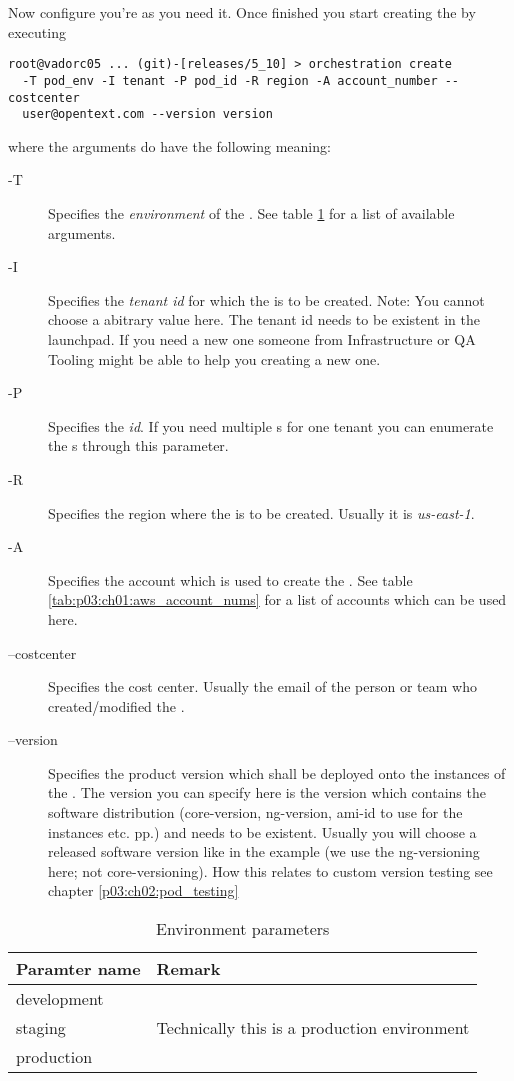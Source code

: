 	Now configure you're \pod{} as you need it. Once finished you start creating the \pod{} by executing
	\begin{verbatim}
root@vadorc05 ... (git)-[releases/5_10] > orchestration create 
  -T pod_env -I tenant -P pod_id -R region -A account_number --costcenter 
  user@opentext.com --version version
	\end{verbatim}
	where the arguments do have the following meaning:
	\begin{description}
		\item[-T] Specifies the \emph{environment} of the \pod{}. See table \ref{tab:p03:ch01:pod_envs} for a list of available arguments.
		\item[-I] Specifies the \emph{tenant id} for which the \pod{} is to be created. Note: You cannot choose a abitrary value here. The tenant id needs to be existent in the launchpad. If you need a new one someone from Infrastructure or QA Tooling might be able to help you creating a new one.
		\item[-P] Specifies the \emph{\pod{} id}. If you need multiple \pod{}s for one tenant you can enumerate the \pod{}s through this parameter.
		\item[-R] Specifies the \aws{} region where the \pod{} is to be created. Usually it is \emph{us-east-1}.
		\item[-A] Specifies the \aws{} account which is used to create the \pod{}. See table \ref{tab:p03:ch01:aws_account_nums} for a list of accounts which can be used here.
		\item[--costcenter] Specifies the cost center. Usually the email of the person or team who created/modified the \pod{}.
		\item[--version] Specifies the product version which shall be deployed onto the instances of the \pod{}. The version you can specify here is the \axceleratepod{} version which contains the software distribution (core-version, ng-version, ami-id to use for the instances etc. pp.) and needs to be existent. Usually you will choose a released software version like in the example (we use the ng-versioning here; not core-versioning). How this relates to custom version testing see chapter \ref{p03:ch02:pod_testing}
	\end{description}
	\begin{table}[h]
         \center
         \caption{\aws{} Environment parameters}
         \begin{tabular}{| l | l |}
           \hline
           \textbf{Paramter name} & \textbf{Remark} \\ \hline
           development & \\ \hline
           staging & Technically this is a production environment \\ \hline
           production & \\ \hline
         \end{tabular}
         \label{tab:p03:ch01:pod_envs}
      \end{table}
